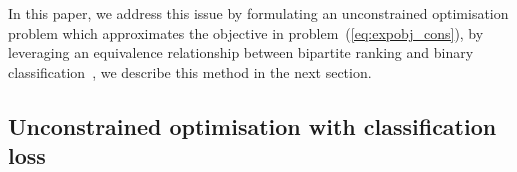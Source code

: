 In this paper, we address this issue by formulating an unconstrained optimisation problem which approximates 
the objective in problem~(\ref{eq:expobj_cons}), by leveraging an equivalence relationship between bipartite 
ranking and binary classification~\cite{ertekin2011equivalence}, we describe this method in the next section.




\subsection{Unconstrained optimisation with classification loss}


